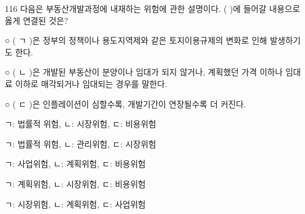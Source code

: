 \begin{question}{116}
다음은 부동산개발과정에 내재하는 위험에 관한 설명이다. ( )에 들어갈 내용으로 옳게 연결된 것은?
\begin{framedtext}
○ ( ㄱ )은 정부의 정책이나 용도지역제와 같은 토지이용규제의 변화로 인해 발생하기도 한다. \par
○ ( ㄴ )은 개발된 부동산이 분양이나 임대가 되지 않거나, 계획했던 가격 이하나 임대료 이하로 매각되거나 임대되는 경우를 말한다. \par
○ ( ㄷ )은 인플레이션이 심할수록, 개발기간이 연장될수록 더 커진다.
\end{framedtext}
\begin{choices}
  \item ㄱ: 법률적 위험, ㄴ: 시장위험, ㄷ: 비용위험
  \item ㄱ: 법률적 위험, ㄴ: 관리위험, ㄷ: 시장위험
  \item ㄱ: 사업위험, ㄴ: 계획위험, ㄷ: 비용위험
  \item ㄱ: 계획위험, ㄴ: 시장위험, ㄷ: 비용위험
  \item ㄱ: 시장위험, ㄴ: 계획위험, ㄷ: 사업위험
\end{choices}
\end{question}
